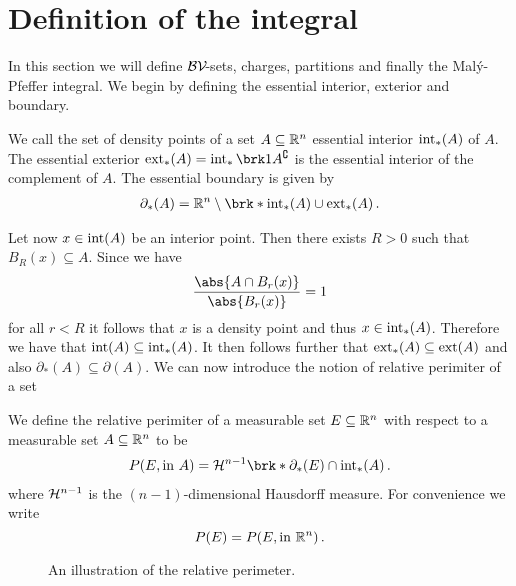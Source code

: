\section{Definition of the integral}

In this section we will define $\mathcal{BV\!}$-sets, charges, partitions and finally the Malý-Pfeffer integral.
We begin by defining the essential interior, exterior and boundary.

\begin{definition}
We call the set of density points of a set $A\subseteq\mathbb{R}^n$ essential interior $\operatorname{int}_*(A)$ of $A$.
The essential exterior $\exterior_*(A)=\interior_*\brk1{A^\complement}$ is the essential interior of the complement of $A$. The essential boundary is given by
\begin{align*}
	\partial_*(A)=\R^n\setminus\brk*{\interior_*(A)\cup\exterior_*(A)}\,.
\end{align*}
\end{definition}

\noindent Let now $x\in\operatorname{int}(A)$ be an interior point. Then there exists $R>0$ such that $B_R(x)\subseteq A$. Since we have
\begin{align*}
	\frac{\abs{A\cap B_r(x)}}{\abs{B_r(x)}}=1
\end{align*}
for all $r<R$ it follows that $x$ is a density point and thus $x\in\operatorname{int}_*(A)$. Therefore we have that $\operatorname{int}(A)\subseteq \operatorname{int}_*(A)$. It then follows further that $\operatorname{ext}_*(A)\subseteq\operatorname{ext}(A)$ and also $\partial_*(A)\subseteq\partial (A)$. We can now introduce the notion of relative perimiter of a set 

\begin{definition}
We define the relative perimiter of a measurable set $E\subseteq\mathbb{R}^n$ with respect to a measurable set $A\subseteq\mathbb{R}^n$ to be
\begin{align*}
	P(E,\text{in }A)=\cH^{n-1}\brk*{\partial_*(E)\cap \interior_*(A)}\,.
\end{align*}
where $\mathcal{H}^{n-1}$ is the $(n-1)$-dimensional Hausdorff measure. For convenience we write $$P(E)=P(E,\text{in }\mathbb{R}^n)\,.$$
\end{definition}

\begin{wrapfigure}{r}{0.3\textwidth}
\centering
\vspace{-0.2cm}

\caption{An illustration of the relative perimeter.}
\label{fi:relativePerimeter}
\end{wrapfigure}

